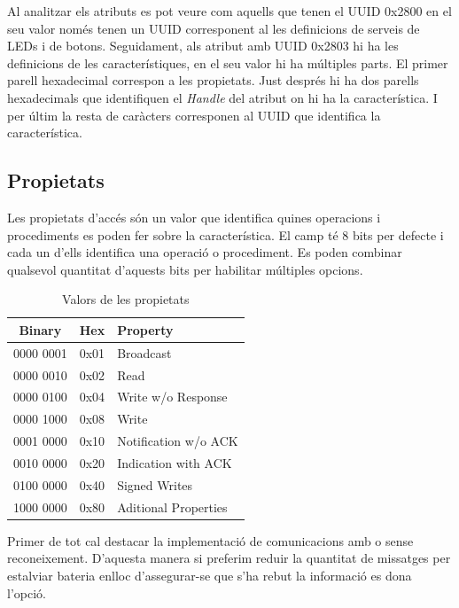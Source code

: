 Al analitzar els atributs es pot veure com aquells que tenen el UUID 0x2800 en el seu valor només tenen un UUID corresponent al les definicions de serveis de LEDs i de botons.
Seguidament, als atribut amb UUID 0x2803 hi ha les definicions de les característiques, en el seu valor hi ha múltiples parts.
El primer parell hexadecimal correspon a les propietats. Just després hi ha dos parells hexadecimals que identifiquen el \textit{Handle} del atribut on hi ha la característica.
I per últim la resta de caràcters corresponen al UUID que identifica la característica.

\subsection{Propietats}
\label{sec:properties}
Les propietats d'accés són un valor que identifica quines operacions i procediments es poden fer sobre la característica.
El camp té 8 bits per defecte i cada un d'ells identifica una operació o procediment.
Es poden combinar qualsevol quantitat d'aquests bits per habilitar múltiples opcions.

\begin{table}[h]
	\begin{center}
		\begin{tabular}{|c|c|l|}
			\hline
			Binary	&	Hex		&	Property	\\	\hline
			0000 0001	&	0x01	&	Broadcast\\	\hline
			0000 0010	&	0x02	&	Read	\\	\hline
			0000 0100	&	0x04	&	Write w/o Response	\\	\hline
			0000 1000	&	0x08	&	Write	\\	\hline
			0001 0000	&	0x10	&	Notification w/o ACK	\\	\hline
			0010 0000	&	0x20	&	Indication with ACK	\\	\hline
			0100 0000	&	0x40	&	Signed Writes	\\	\hline
			1000 0000	&	0x80	&	Aditional Properties	\\	\hline
		\end{tabular}
	\end{center}
\caption{Valors de les propietats}
\end{table}


Primer de tot cal destacar la implementació de comunicacions amb o sense reconeixement. D'aquesta manera si preferim reduir la quantitat de missatges per estalviar bateria enlloc d'assegurar-se que s'ha rebut la informació es dona l'opció.

